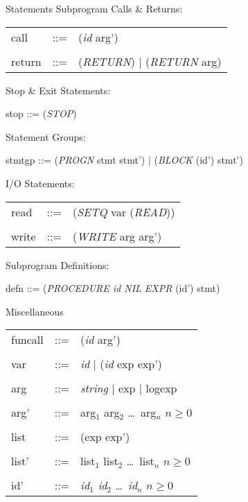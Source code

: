 \begin{describe}{Statements}
Subprogram Calls \& Returns:

\begin{tabular}{lll}
call & ::= & ({\it id\/} arg')\\
& &\\
return & ::= & ({\it RETURN\/})  $\mid$  ({\it RETURN\/} arg)\\
\end{tabular}

Stop \& Exit Statements:

stop ::= ({\it STOP\/})

Statement Groups:

stmtgp  ::=  ({\it PROGN\/} stmt stmt')  $\mid$  ({\it BLOCK\/} (id') stmt')

I/O Statements:

\begin{tabular}{lll}
read & ::= & ({\it SETQ\/} var ({\it READ\/}))\\
& &\\
write & ::= & ({\it WRITE\/} arg arg')\\
\end{tabular}

Subprogram Definitions:

defn  ::=  ({\it PROCEDURE id NIL EXPR\/} (id') stmt)

\end{describe}

\begin{describe}{Miscellaneous}
\begin{tabular}{lll} 
funcall & ::= & ({\it id\/} arg')\\
& &\\
var & ::= & {\it id\/} $\mid$  ({\it id\/} exp exp')\\
& &\\
arg & ::= & {\it string\/} $\mid$  exp  $\mid$  logexp\\
& &\\
arg' & ::= & arg$_1$ arg$_2$ \dots\  arg$_n$  $n \geq 0$ \\
& &\\
list & ::= & (exp exp')\\
& &\\
list' & ::= & list$_1$ list$_2$ \dots\  list$_n$   $n \geq 0$ \\
& &\\
id' &  ::= & {\it id$_1$ id$_2$} \dots\ {\it id$_n$}  $n \geq 0$ \\
\end{tabular}
\end{describe}

